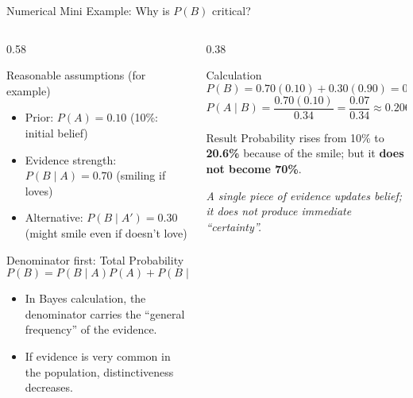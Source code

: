 \documentclass[light]{lutbeamer}
\begin{document}
\begin{frame}{Numerical Mini Example: Why is \texorpdfstring{$P(B)$}{P(B)} critical?}
    \small
    \begin{columns}[T]
        \begin{column}{0.58\textwidth}
            \begin{block}{Reasonable assumptions (for example)}
                \begin{itemize}
                    \item Prior: $P(A)=0.10$ \hfill (10\%: initial belief)
                    \item Evidence strength: $P(B\mid A)=0.70$ \hfill (smiling if loves)
                    \item Alternative: $P(B\mid A')=0.30$ \hfill (might smile even if doesn't love)
                \end{itemize}
            \end{block}

            \begin{block}{Denominator first: Total Probability}
                \[
                P(B)=P(B\mid A)P(A)+P(B\mid A')P(A').
                \]
            \end{block}

            \begin{itemize}
                \item In Bayes calculation, the denominator carries the ``general frequency'' of the evidence.
                \item If evidence is very common in the population, distinctiveness decreases.
            \end{itemize}
        \end{column}

        \begin{column}{0.38\textwidth}
            \begin{block}{Calculation}
                \footnotesize
                \[
                P(B)=0.70(0.10)+0.30(0.90)=0.34
                \]
                \[
                P(A\mid B)=\frac{0.70(0.10)}{0.34}=\frac{0.07}{0.34}\approx 0.206
                \]
            \end{block}

            \begin{alertblock}{Result}
                Probability rises from 10\% to \textbf{20.6\%} because of the smile;
                but it \textbf{does not become 70\%}.
            \end{alertblock}

            \tiny
            \textit{A single piece of evidence updates belief; it does not produce immediate ``certainty''.}
        \end{column}
    \end{columns}
\end{frame}
\end{document}
